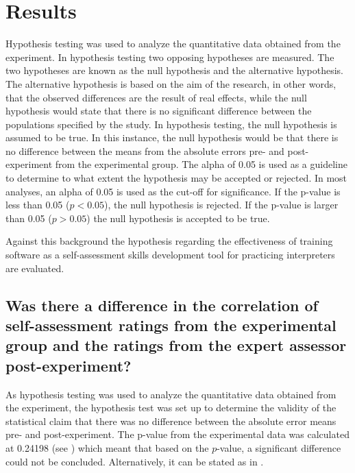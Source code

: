 \documentclass[output=paper]{langsci/langscibook}
\begin{document}
\section{Results}
Hypothesis testing was used to analyze the quantitative data obtained from the experiment. In hypothesis testing two opposing hypotheses are measured. The two hypotheses are known as the null hypothesis and the alternative hypothesis. The alternative hypothesis is based on the aim of the research, in other words, that the observed differences are the result of real effects, while the null hypothesis would state that there is no significant difference between the populations specified by the study. In hypothesis testing, the null hypothesis is assumed to be true. In this instance, the null hypothesis would be that there is no difference between the means from the absolute errors pre- and post-experiment from the experimental group. The alpha of 0.05 is used as a guideline to determine to what extent the hypothesis may be accepted or rejected. In most analyses, an alpha of 0.05 is used as the cut-off for significance. If the p-value is less than 0.05 ($p < 0.05$), the null hypothesis is rejected. If the p-value is larger than 0.05 ($p > 0.05$) the null hypothesis is accepted to be true. 

Against this background the hypothesis regarding the effectiveness of training software as a self-assessment skills development tool for practicing interpreters are evaluated.

\subsection{Was there a difference in the correlation of self-assessment ratings from the experimental group and the ratings from the expert assessor post-experiment?}

As hypothesis testing was used to analyze the quantitative data obtained from the experiment, the hypothesis test was set up to determine the validity of the statistical claim that there was no difference between the absolute error means pre- and post-experiment. The p-value from the experimental data was calculated at 0.24198 (see ) which meant that based on the $p$-value, a significant difference could not be concluded. Alternatively, it can be stated as in .
\end{document}
